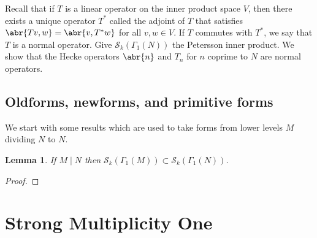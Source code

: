 \documentclass[10pt,leqno,twoside]{article}
\theoremstyle{plain}
\newtheorem{lemma}[lem]{Lemma}
\theoremstyle{definition}
\numberwithin{equation}{section}
\numberwithin{lem}{section}
\newcommand{\textib}[1]{\textbf{\textit{#1\index{#1}}}} %
\newcommand{\tbd}{{\Huge\color{red}{\textib{TBD}}}}
\begin{document}
Recall that if $T$ is a linear operator on the inner product space $V$, then there exists a unique operator $T^\ast$ called the adjoint of $T$ that satisfies $\abr{Tv,w} = \abr{v,T^\ast w}$ for all $v,w\in V$. If $T$ commutes with $T^\ast$, we say that $T$ is a normal operator. Give $\mathcal S_k(\varGamma_1(N))$ the Petersson inner product. We show that the Hecke operators $\abr{n}$ and $T_n$ for $n$ coprime to $N$ are normal operators.



\subsection{Oldforms, newforms, and primitive forms}
We start with some results which are used to take forms from lower levels $M$ dividing $N$ to $N$.
\begin{lemma}
    If $M\mid N$ then $\mathcal S_k(\varGamma_1(M))\subset \mathcal S_k(\varGamma_1(N))$.
\end{lemma}
\begin{proof}
    \tbd
\end{proof}


\newpage\section{Strong Multiplicity One}
\end{document}
